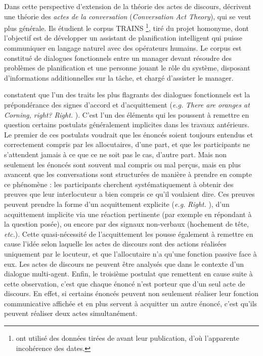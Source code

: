 \documentclass[10pt,a4paper,twoside]{article}
\begin{document}
Dans cette perspective d'extension de la théorie des actes de discours, \citet{traum1992conversation} décrivent une théorie des \textit{actes de la conversation} (\textit{Conversation Act Theory}), qui se veut plus générale. Ils étudient le corpus TRAINS \cite{gross1993trains}\footnote{\citeauthor{traum1992conversation} ont utilisé des données tirées de \cite{gross1993trains} avant leur publication, d'où l'apparente incohérence des dates.}, tiré du projet homonyme, dont l'objectif est de développer un assistant de planification intelligent qui puisse communiquer en langage naturel avec des opérateurs humains. Le corpus est constitué de dialogues fonctionnels entre un manager devant résoudre des problèmes de planification et une personne jouant le rôle du système, disposant d'informations additionnelles sur la tâche, et chargé d'assister le manager.

\citeauthor{traum1992conversation} constatent que l'un des traits les plus flagrants des dialogues fonctionnels est la prépondérance des signes d'accord et d'acquittement (\textit{e.g.} \textit{\og There are oranges at Corning, right? \fg{} \og Right. \fg}). C'est l'un des éléments qui les poussent à remettre en question certains postulats généralement implicites dans les travaux antérieurs. Le premier de ces postulats voudrait que les énoncés soient toujours entendus et correctement compris par les allocutaires, d'une part, et que les participants ne s'attendent jamais à ce que ce ne soit pas le cas, d'autre part. Mais non seulement les énoncés sont souvent mal compris ou mal perçus, mais en plus \citeauthor{traum1992conversation} avancent que les conversations sont structurées de manière à prendre en compte ce phénomène : les participants cherchent systématiquement à obtenir des preuves que leur interlocuteur a bien compris ce qu'il voulaient dire. Ces preuves peuvent prendre la forme d'un acquittement explicite (\textit{e.g.} \textit{\og Right. \fg}), d'un acquittement implicite via une réaction pertinente (par exemple en répondant à la question posée), ou encore par des signaux non-verbaux (hochement de tête, \textit{etc.}). Cette quasi-nécessité de l'acquittement les pousse également à remettre en cause l'idée selon laquelle les actes de discours sont des actions réalisées uniquement par le locuteur, et que l'allocutaire n'a qu'une fonction passive face à eux. Les actes de discours ne peuvent être analysés que dans le contexte d'un dialogue multi-agent. Enfin, le troisième postulat que \citeauthor{traum1992conversation} remettent en cause suite à cette observation, c'est que chaque énoncé n'est porteur que d'un seul acte de discours. En effet, si certains énoncés peuvent non seulement réaliser leur fonction communicative affichée et en plus servent à acquitter un autre énoncé, c'est qu'ils peuvent réaliser deux actes simultanément.
\end{document}
